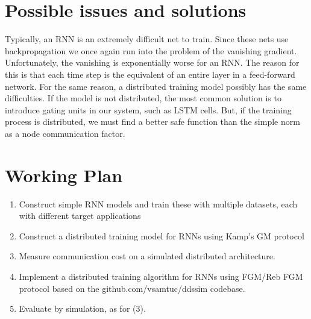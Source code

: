 \documentclass{article}
\begin{document}
    \section*{Possible issues and solutions}
    Typically, an RNN is an extremely difficult net to train.
    Since these nets use backpropagation we once again run into the problem of the vanishing gradient.
    Unfortunately, the vanishing is exponentially worse for an RNN. The reason for this is that each time step is the equivalent of an entire layer in a feed-forward network.
    For the same reason, a distributed training model possibly has the same difficulties.
    If the model is not distributed, the most common solution is to introduce gating units in our system, such as LSTM cells.
    But, if the training process is distributed, we must find a better safe function than the simple norm as a node communication factor.

    \section*{Working Plan}
    \begin{enumerate}[label=\arabic*)]
        \item Construct simple RNN models and train these with multiple datasets, each with different target applications
        \item Construct a distributed training model for RNNs using Kamp's GM protocol
        \item Measure communication cost on a simulated distributed architecture.
        \item Implement a distributed training algorithm for RNNs using FGM/Reb FGM protocol based on the github.com/vsamtuc/ddssim codebase.
        \item Evaluate by simulation, as for (3).
    \end{enumerate}

\end{document}
